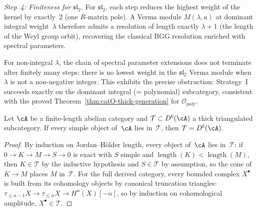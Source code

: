 \begin{computation}
\emph{Step~4: Finiteness for $\mathfrak{sl}_2$.}
For $\mathfrak{sl}_2$, each step reduces the highest weight of the
kernel by exactly~$2$ (one $R$-matrix pole). A Verma module
$M(\lambda, a)$ at dominant integral weight~$\lambda$ therefore
admits a resolution of length exactly $\lambda + 1$ (the length of
the Weyl group orbit), recovering the classical BGG resolution
enriched with spectral parameters.

For non-integral $\lambda$, the chain of spectral parameter
extensions does not terminate after finitely many steps: there is no
lowest weight in the $\mathfrak{sl}_2$ Verma module when $\lambda$
is not a non-negative integer. This exhibits the precise
obstruction: Strategy~I succeeds exactly on the dominant integral
(= polynomial) subcategory, consistent with the proved
Theorem~\ref{thm:catO-thick-generation} for
$\mathcal{O}_{\mathrm{poly}}$.
\end{computation}

\begin{proposition}
\label{prop:heart-capture-criterion}
Let $\cA$ be a finite-length abelian category and
$\mathcal{T} \subset D^b(\cA)$ a thick triangulated subcategory.
If every simple object of~$\cA$ lies in~$\mathcal{T}$, then
$\mathcal{T} = D^b(\cA)$.
\end{proposition}
\begin{proof}
By induction on Jordan--H\"older length, every object
of~$\cA$ lies in~$\mathcal{T}$: if $0 \to K \to M \to S \to 0$
is exact with $S$ simple and $\operatorname{length}(K) < \operatorname{length}(M)$,
then $K \in \mathcal{T}$ by the inductive hypothesis and $S \in \mathcal{T}$
by assumption, so the cone of $K \to M$ places $M$ in~$\mathcal{T}$.
For the full derived category, every bounded complex
$X^\bullet$ is built from its cohomology objects by canonical
truncation triangles: $\tau_{\leq n-1}X \to \tau_{\leq n}X \to H^n(X)[-n]$,
so by induction on cohomological amplitude, $X^\bullet \in \mathcal{T}$.
\end{proof}

